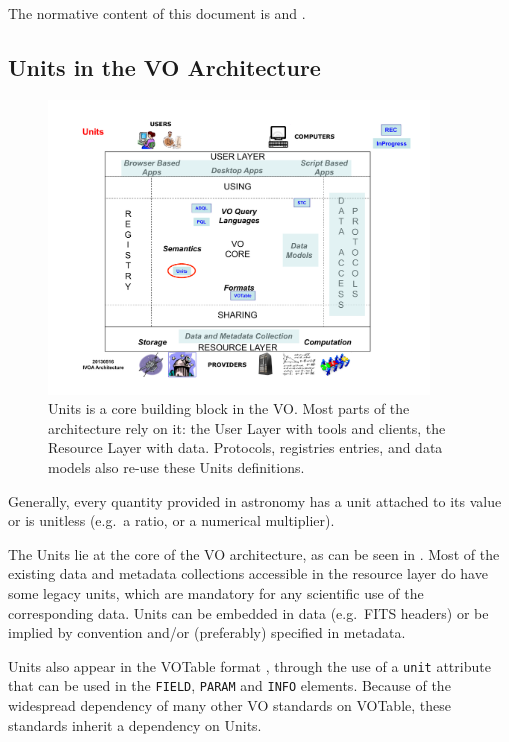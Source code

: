 \documentclass[11pt,notitlepage,onecolumn]{ivoa}
\def\eg{e.g.~}
\begin{document}
The normative content of this document is  and .

\subsection{Units in the VO Architecture}

\begin{figure}[htbp]
  \centerline{\includegraphics[width=0.9\textwidth]{unitsInIVOA.pdf}}
  \caption{Units is a core building block in the VO.  Most parts of the
  architecture rely on it: the User Layer with tools and clients, the
  Resource Layer with data.  Protocols, registries entries, and
  data models also re-use these Units definitions.}
  \label{fig:architecture}
\end{figure}

Generally, every quantity provided in astronomy has a unit attached to
its value or is unitless (\eg a ratio, or a numerical multiplier).  

The Units lie at the core of the VO architecture, as can be seen in .
Most of the existing data and metadata collections accessible in the resource
layer do have some legacy units, which are mandatory for any scientific use of
the corresponding data.  Units can be embedded in data (\eg FITS headers) or be
implied by convention and/or (preferably) specified in metadata.


Units also appear in the VOTable format \citep{ochsenbein11}, through the use
of a {\tt unit} attribute that can be used in the {\tt FIELD}, {\tt PARAM} and {\tt INFO} 
elements. Because of the widespread dependency of many other VO standards on VOTable,
these standards inherit a dependency on Units.
\end{document}
